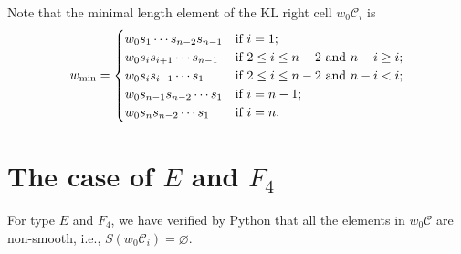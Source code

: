 \documentclass[11pt, reqno]{amsart}
\theoremstyle{definition}
\numberwithin{equation}{section}
\begin{document}
Note that  the minimal length element 
 of the KL right cell $w_0\mathcal{C}_i$ is 
 $$w_{\rm min}=\begin{cases}
w_0s_1\cdots s_{n-2}s_{n-1} & \text{if~}i=1;\\
w_0s_is_{i+1}\cdots s_{n-1}  & \text{if~} 2\leq i\leq n-2\text{~and~}n-i\geq i;\\
w_0s_is_{i-1}\cdots s_{1}  & \text{if~} 2\leq i\leq n-2\text{~and~}n-i< i;\\
w_0s_{n-1}s_{n-2}\cdots s_1& \text{if~}i=n-1;\\
w_0s_{n}s_{n-2}\cdots s_1 & \text{if~}i=n.
\end{cases} $$











\section{The case of $E$ and $F_4$}\label{typeef}

For type $E$ and $F_4$, we have verified by Python that all the elements in $w_0\mathcal{C}$ are non-smooth, i.e.,  $S(w_0\mathcal{C}_i)=\varnothing$.
\end{document}
